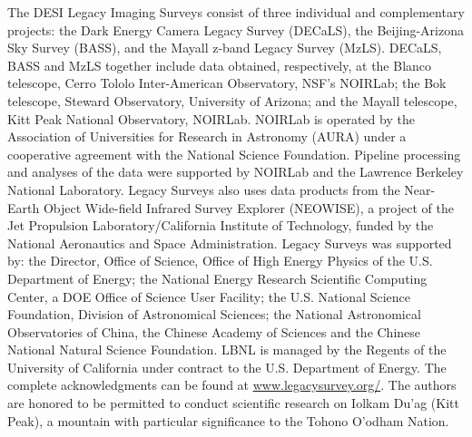 The DESI Legacy Imaging Surveys consist of three individual and complementary projects: the Dark Energy Camera Legacy Survey (DECaLS), the Beijing-Arizona Sky Survey (BASS), and the Mayall z-band Legacy Survey (MzLS). DECaLS, BASS and MzLS together include data obtained, respectively, at the Blanco telescope, Cerro Tololo Inter-American Observatory, NSF’s NOIRLab; the Bok telescope, Steward Observatory, University of Arizona; and the Mayall telescope, Kitt Peak National Observatory, NOIRLab. NOIRLab is operated by the Association of Universities for Research in Astronomy (AURA) under a cooperative agreement with the National Science Foundation. Pipeline processing and analyses of the data were supported by NOIRLab and the Lawrence Berkeley National Laboratory. Legacy Surveys also uses data products from the Near-Earth Object Wide-field Infrared Survey Explorer (NEOWISE), a project of the Jet Propulsion Laboratory/California Institute of Technology, funded by the National Aeronautics and Space Administration. Legacy Surveys was supported by: the Director, Office of Science, Office of High Energy Physics of the U.S. Department of Energy; the National Energy Research Scientific Computing Center, a DOE Office of Science User Facility; the U.S. National Science Foundation, Division of Astronomical Sciences; the National Astronomical Observatories of China, the Chinese Academy of Sciences and the Chinese National Natural Science Foundation. LBNL is managed by the Regents of the University of California under contract to the U.S. Department of Energy. The complete acknowledgments can be found at \href{https://www.legacysurvey.org/}{www.legacysurvey.org/}. The authors are honored to be permitted to conduct scientific research on Iolkam Du’ag (Kitt Peak), a mountain with particular significance to the Tohono O’odham Nation.